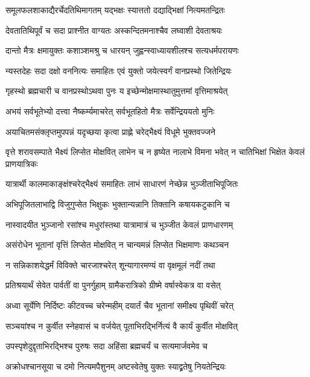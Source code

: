 \twolineshloka
{समूलफलशाकाद्यैरर्चेदतिथिमागतम्}
{यद्भक्षः स्यात्ततो दद्याद्भिक्षां नित्यमतन्द्रितः}


\twolineshloka
{देवतातिथिपूर्वं च सदा प्राश्नीत वाग्यतः}
{अस्कन्दितमनाश्चैव लघ्वाशी देवताश्रयः}


\twolineshloka
{दान्तो मैत्रः क्षमायुक्तः कशाञ्शमश्रु च धारयन्}
{जुह्वन्स्वाध्यायशीलश्च सत्यधर्मपरायणः}


\twolineshloka
{न्यस्तदेहः सदा दक्षो वननित्यः समाहितः}
{एवं युक्तो जयेत्स्वर्गं वानप्रस्थो जितेन्द्रियः}


\twolineshloka
{गृहस्थो ब्रह्मचारी च वानप्रस्थोऽथवा पुनः}
{य इच्छेन्मोक्षमास्थातुमुत्तमां वृत्तिमाश्रयेत्}


\twolineshloka
{अभयं सर्वभूतेभ्यो दत्त्वा नैष्कर्म्यमाचरेत्}
{सर्वभूतहितो मैत्रः सर्वेन्द्रिययतो मुनिः}


\twolineshloka
{अयाचितमसंक्लृप्तमुपपन्नं यदृच्छया}
{कृत्वा प्राह्णे चरेद्भैक्ष्यं विधूमे भुक्तवज्जने}


\threelineshloka
{वृत्ते शरावसम्पाते भैक्ष्यं लिप्सेत मोक्षवित्}
{लाभेन च न हृष्येत नालाभे विमना भवेत्}
{न चातिभिक्षां भिक्षेत केवलं प्राणयात्रिकः}


\twolineshloka
{यात्रार्थी कालमाकाङ्क्षंश्चरेद्भैक्ष्यं समाहितः}
{लाभं साधारणं नेच्छेन्न भुञ्जीताभिपूजितः}


\twolineshloka
{अभिपूजितलाभाद्वि विजुगुप्सेत भिक्षुकः}
{भुक्तान्यन्नानि तिक्तानि कषायकटुकानि च}


\twolineshloka
{नास्वादयीत भुञ्जानो रसांश्च मधुरांस्तथा}
{यात्रामात्रं च भुञ्जीत केवलं प्राणधारणम्}


\twolineshloka
{असंरोधेन भूतानां वृत्तिं लिप्सेत मोक्षवित्}
{न चान्यमन्नं लिप्सेत भिक्षमाणः कथञ्चन}


\twolineshloka
{न सन्निकाशयेद्धर्मं विविक्ते चारजाश्चरेत्}
{शून्यागारमण्यं वा वृक्षमूलं नदीं तथा}


\twolineshloka
{प्रतिश्रयार्थं सेवेत पार्वतीं वा पुनर्गुहाम्}
{ग्रामैकरात्रिको ग्रीष्मे वर्षास्वेकत्र वा वसेत्}


\twolineshloka
{अध्वा सूर्येणि निर्दिष्टः कीटवच्च चरेन्महीम्}
{दयार्तं चैव भूतानां समीक्ष्य पृथिवीं चरेत्}


\twolineshloka
{सञ्चयांश्च न कुर्वीत स्नेहवासं च वर्जयेत्}
{पूताभिरद्भिर्नित्यं वै कार्यं कुर्वीत मोक्षवित्}


\twolineshloka
{उपस्पृशेदुद्दृताभिरद्भिश्च पुरुषः सदा}
{अहिंसा ब्रह्मचर्यं च सत्यमार्जवमेव च}


\twolineshloka
{अक्रोधश्चानसूया च दमो नित्यमपैशुनम्}
{अष्टस्वेतेषु युक्तः स्याद्व्रतेषु नियतेन्द्रियः}


